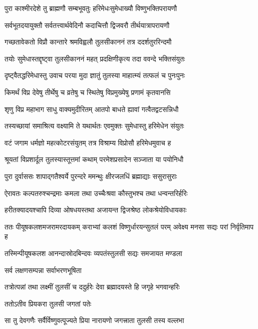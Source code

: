 \twolineshloka
{पुरा काश्मीरदेशे तु ब्राह्मणौ सम्बभूवतुः}
{हरिमेधःसुमेधाख्यौ विष्णुभक्तिपरायणौ} %

\twolineshloka
{सर्वभूतदयायुक्तौ सर्वतत्त्वार्थवेदिनौ}
{कदाचित्तौ द्विजवरौ तीर्थयात्रापरायणौ} %

\twolineshloka
{गच्छतावेकतो विप्रौ कान्तारे श्रमविह्वलौ}
{तुलसीकाननं तत्र ददर्शतुररिन्दमौ} %

\twolineshloka
{तयोः सुमेधास्तद्दृष्ट्वा तुलसीकाननं महत्}
{प्रदक्षिणीकृत्य तदा ववन्दे भक्तिसंयुतः} %

\twolineshloka
{दृष्ट्वैतद्धरिमेधास्तु उवाच परया मुदा}
{ज्ञातुं तुलस्या माहात्म्यं तत्फलं च पुनःपुनः} %

\twolineshloka
{किमर्थं विप्र देवेषु तीर्थेषु च व्रतेषु च}
{स्थितेषु विप्रमुख्येषु प्रणामं कृतवानसि} %


\twolineshloka
{शृणु विप्र महाभाग साधु वाक्यमुदीरितम्}
{आतपो बाधते ह्यावां गत्वैतद्वटसन्निधौ} %

\twolineshloka
{तस्यच्छायां समाश्रित्य वक्ष्यामि ते यथार्थतः}
{एवमुक्तः सुमेधास्तु हरिमेधेन संयुतः} %

\twolineshloka
{वटं जगाम धर्मज्ञो महत्कोटरसंयुतम्}
{तत्र विश्राम्य विप्रोसौ हरिमेधमुवाच ह} %

\twolineshloka
{श्रूयतां विप्रशार्दूल तुलस्यास्तूत्तमां कथाम्}
{परमेशप्रसादेन सञ्जाता या पयोनिधौ} %

\twolineshloka
{पुरा दुर्वाससः शापाद्गतैश्वर्ये पुरन्दरे}
{ममन्थुः क्षीरजलधिं ब्रह्माद्याः ससुरासुराः} %

\twolineshloka
{ऐरावतः कल्पतरुश्चन्द्रमाः कमला तथा}
{उच्चैःश्रवा कौस्तुभश्च तथा धन्वन्तरिर्हरिः} %

\twolineshloka
{हरीतक्यादयश्चापि दिव्या ओषधयस्तथा}
{अजायन्त द्विजश्रेष्ठ लोकश्रेयोविधायकाः} %

\threelineshloka
{ततः पीयूषकलशमजरामरदायकम्}
{कराभ्यां कलशं विष्णुर्धारयन्सुतलं परम्}
{अवेक्ष्य मनसा सद्यः परां निर्वृतिमाप ह} %

\twolineshloka
{तस्मिन्पीयूषकलश आनन्दास्रोदबिन्दवः}
{व्यपतंस्तुलसी सद्यः समजायत मण्डला} %


\onelineshloka
{सर्व लक्षणसम्पन्ना सर्वाभरणभूषिता} %

\twolineshloka
{तत्रोत्पन्नां तथा लक्ष्मीं तुलसीं च ददुर्हरेः}
{देवा ब्रह्मादयस्ते हि जगृहे भगवान्हरिः} %


\onelineshloka
{ततोऽतीव प्रियकरा तुलसी जगतां पतेः} %

\twolineshloka
{सा तु देवगणैः सर्वैर्विष्णुवत्पूज्यते प्रिया}
{नारायणो जगत्त्राता तुलसी तस्य वल्लभा} %

